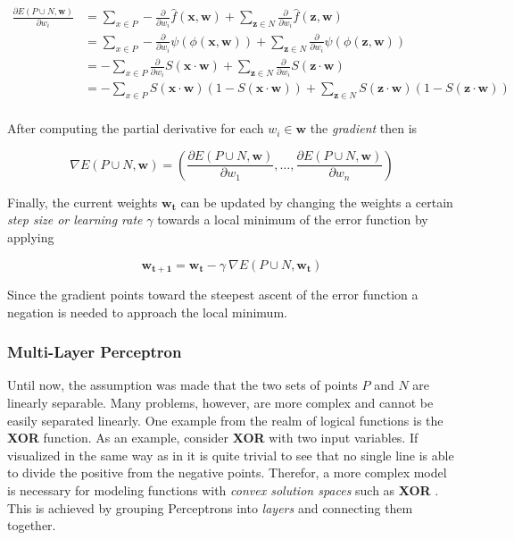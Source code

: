 \begin{equation}
    \label{eq:error-derivative-2}
    \begin{split}
        \frac{\partial E(P \cup N, \bm{w})}{\partial w_i}
        &= \sum_{x \in P} - \frac{\partial }{\partial w_i} \hat{f}(\bm{x},\bm{w}) + \sum_{\bm{z} \in N} \frac{\partial }{\partial w_i} \hat{f}(\bm{z},\bm{w})  \\
        &=  \sum_{x \in P} - \frac{\partial }{\partial w_i} \psi(\phi(\bm{x},\bm{w})) + \sum_{\bm{z} \in N} \frac{\partial }{\partial w_i} \psi(\phi(\bm{z},\bm{w})) \\
        &=  - \sum_{x \in P} \frac{\partial }{\partial w_i} S(\bm{x} \cdot \bm{w}) + \sum_{\bm{z} \in N} \frac{\partial }{\partial w_i} S(\bm{z} \cdot \bm{w}) \\
        &=  - \sum_{x \in P}  S(\bm{x} \cdot \bm{w}) (1 - S(\bm{x} \cdot \bm{w})) + \sum_{\bm{z} \in N} S(\bm{z} \cdot \bm{w}) (1 - S(\bm{z} \cdot \bm{w}))\\
    \end{split}
\end{equation}

After computing the partial derivative for each $w_i \in \bm{w}$ the \textit{gradient} then is

\begin{equation}
    \nabla E(P \cup N, \bm{w}) = \left(\frac{\partial E(P \cup N, \bm{w})}{\partial w_1}, \dots, \frac{\partial E(P \cup N, \bm{w})}{\partial w_n} \right)
\end{equation}

Finally, the current weights $\bm{w_t}$ can be updated by changing the weights a certain \textit{step size or learning rate} $\gamma$ towards a local minimum of the error function by applying

\begin{equation}
    \label{eq:gradient-binary-update}
    \bm{w_{t+1}} = \bm{w_t} - \gamma ~ \nabla E(P \cup N, \bm{w_t})
\end{equation}

Since the gradient points toward the steepest ascent of the error function a negation is needed to approach the local minimum.

\subsubsection{Multi-Layer Perceptron}
Until now, the assumption was made that the two sets of points $P$ and $N$ are linearly separable.
Many problems, however, are more complex and cannot be easily separated linearly.
One example from the realm of logical functions is the \textbf{XOR} function.
As an example, consider \textbf{XOR} with two input variables.
If visualized in the same way as in  it is quite trivial to see that no single line is able to divide the positive from the negative points.
Therefor, a more complex model is necessary for modeling functions with \textit{convex solution spaces} such as \textbf{XOR} .
This is achieved by grouping Perceptrons into \textit{layers} and connecting them together.

